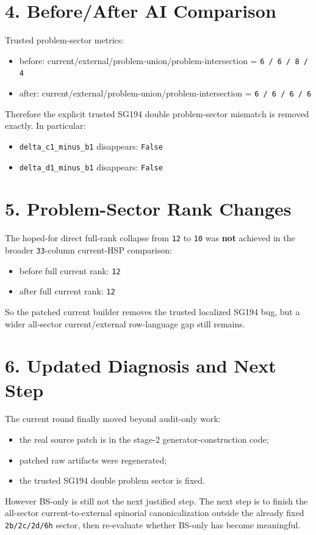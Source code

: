 \documentclass[11pt]{article}
\begin{document}
\section*{4. Before/After AI Comparison}
Trusted problem-sector metrics:
\begin{itemize}
\item before: current/external/problem-union/problem-intersection = \texttt{6 / 6 / 8 / 4}
\item after: current/external/problem-union/problem-intersection = \texttt{6 / 6 / 6 / 6}
\end{itemize}
Therefore the explicit trusted SG194 double problem-sector mismatch is removed exactly. In particular:
\begin{itemize}
\item \texttt{delta\_c1\_minus\_b1} disappears: \texttt{False}
\item \texttt{delta\_d1\_minus\_b1} disappears: \texttt{False}
\end{itemize}

\section*{5. Problem-Sector Rank Changes}
The hoped-for direct full-rank collapse from \texttt{12} to \texttt{10} was \textbf{not} achieved in the broader \texttt{33}-column current-HSP comparison:
\begin{itemize}
\item before full current rank: \texttt{12}
\item after full current rank: \texttt{12}
\end{itemize}
So the patched current builder removes the trusted localized SG194 bug, but a wider all-sector current/external row-language gap still remains.

\section*{6. Updated Diagnosis and Next Step}
The current round finally moved beyond audit-only work:
\begin{itemize}
\item the real source patch is in the stage-2 generator-construction code;
\item patched raw artifacts were regenerated;
\item the trusted SG194 double problem sector is fixed.
\end{itemize}
However BS-only is still not the next justified step. The next step is to finish the all-sector current-to-external spinorial canonicalization outside the already fixed \texttt{2b/2c/2d/6h} sector, then re-evaluate whether BS-only has become meaningful.
\end{document}
